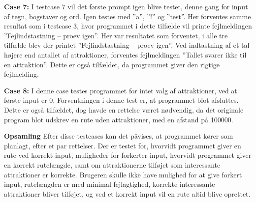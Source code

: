 \textbf{Case 7:}\newline
I testcase 7 vil det første prompt igen blive testet, denne gang for input af tegn, bogstaver og ord. Igen testes med ”a”, ”!” og ”test”. Her forventes samme resultat som i testcase 3, hvor programmet i dette tilfælde vil printe fejlmeldingen ”Fejlindstastning – proev igen”. Her var resultatet som forventet, i alle tre tilfælde blev der printet ”Fejlindstastning – proev igen”. Ved  indtastning af et tal højere end antallet af attraktioner, forventes fejlmeldingen ”Tallet svarer ikke til en attraktion”. Dette er også tilfældet, da programmet giver den rigtige fejlmelding.

\textbf{Case 8:}\newline
I denne case testes programmet for intet valg af attraktioner, ved at første input er 0. Forventningen i denne test er, at programmet blot afsluttes. Dette er også tilfældet, dog havde en rettelse været nødvendig, da det originale program blot udskrev en rute uden attraktioner, med en afstand på 100000.


\textbf{Opsamling}\newline
Efter disse testcases kan det påvises, at programmet kører som planlagt, efter et par rettelser. Der er testet for, hvorvidt programmet giver en rute ved korrekt input, muligheder for forkerter input, hvorvidt programmet giver en korrekt rutelængde, samt om attraktionerne tilføjet som interessante attraktioner er korrekte. Brugeren skulle ikke have mulighed for at give forkert input, rutelængden er med minimal fejlagtighed, korrekte interessante attraktioner bliver tilføjet, og ved et korrekt input vil en rute altid blive oprettet.